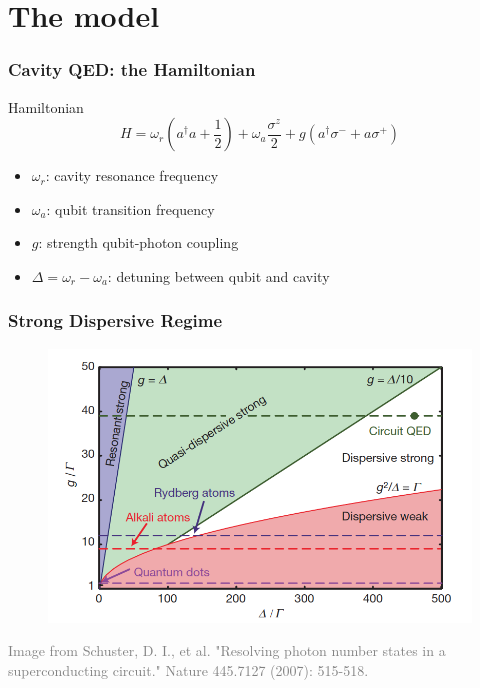 \documentclass[xcolor=dvipsnames,hyperref={CJKbookmarks=true}]{beamer}
\begin{document}
\section{The model}
\begin{frame}
\frametitle{Cavity QED: the Hamiltonian}
\begin{block}{Hamiltonian}
$$H =  \omega_r \left(a^{\dagger} a+ \dfrac{1}{2} \right) +  \omega_a \dfrac{\sigma^{z}}{2}+  g \left(a^{\dagger}\sigma^{-}+a\sigma^{+}\right)$$
\end{block}
\vspace{0.5cm}
\begin{itemize}
\item $\omega_r$: cavity resonance frequency
\vspace{0.3cm}
\item $\omega_a$: qubit transition frequency
\vspace{0.3cm}
\item $g$: strength qubit-photon coupling
\vspace{0.3cm}
\item $\Delta = \omega_r - \omega_a$: detuning between qubit and cavity
\end{itemize}
\end{frame}


\begin{frame}
\frametitle{Strong Dispersive Regime}
\begin{figure}
\centering
\includegraphics[width=.9\textwidth]{Regime}
\end{figure}

\tiny{\textcolor{gray}{Image from Schuster, D. I., et al. "Resolving photon number states in a superconducting circuit." Nature 445.7127 (2007): 515-518.\cite{schuster2007resolving}}}
\end{frame}
\end{document}
